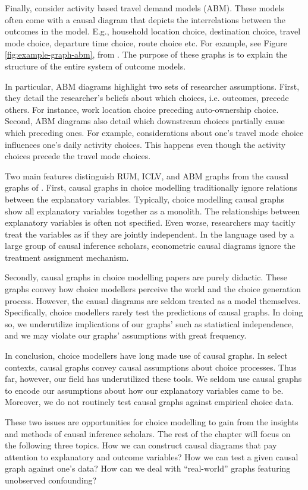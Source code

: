 Finally, consider activity based travel demand models (ABM).
These models often come with a causal diagram that depicts the interrelations between the outcomes in the model.
E.g., household location choice, destination choice, travel mode choice, departure time choice, route choice etc.
For example, see Figure \ref{fig:example-graph-abm}, from \citet[Fig. 2]{bradley_2010_sacsim}.
The purpose of these graphs is to explain the structure of the entire system of outcome models.

In particular, ABM diagrams highlight two sets of researcher assumptions.
First, they detail the researcher's beliefs about which choices, i.e. outcomes, precede others.
For instance, work location choice preceding auto-ownership choice.
Second, ABM diagrams also detail which downstream choices partially cause which preceding ones.
For example, considerations about one's travel mode choice influences one's daily activity choices.
This happens even though the activity choices precede the travel mode choices.

Two main features distinguish RUM, ICLV, and ABM graphs from the causal graphs of \citet{pearl_1995_causal}.
First, causal graphs in choice modelling traditionally ignore relations between the explanatory variables.
Typically, choice modelling causal graphs show all explanatory variables together as a monolith.
The relationships between explanatory variables is often not specified.
Even worse, researchers may tacitly treat the variables as if they are jointly independent.
In the language used by a large group of causal inference scholars, econometric causal diagrams ignore the treatment assignment mechanism.

Secondly, causal graphs in choice modelling papers are purely didactic.
These graphs convey how choice modellers perceive the world and the choice generation process.
However, the causal diagrams are seldom treated as a model themselves.
Specifically, choice modellers rarely test the predictions of causal graphs.
In doing so, we underutilize implications of our graphs' such as statistical independence, and we may violate our graphs' assumptions with great frequency.

In conclusion, choice modellers have long made use of causal graphs.
In select contexts, causal graphs convey causal assumptions about choice processes.
Thus far, however, our field has underutilized these tools.
We seldom use causal graphs to encode our assumptions about how our explanatory variables came to be.
Moreover, we do not routinely test causal graphs against empirical choice data.

These two issues are opportunities for choice modelling to gain from the insights and methods of causal inference scholars.
The rest of the chapter will focus on the following three topics.
How we can construct causal diagrams that pay attention to explanatory and outcome variables?
How we can test a given causal graph against one's data?
How can we deal with ``real-world'' graphs featuring unobserved confounding?
